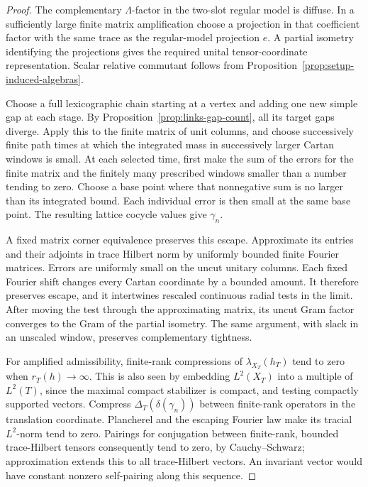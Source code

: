\begin{proof}
The complementary \(\Lambda\)-factor in the two-slot regular
model is diffuse.  In a sufficiently large finite matrix
amplification choose a projection in that coefficient factor
with the same trace as the regular-model projection \(e\).
A partial isometry identifying the projections gives the
required unital tensor-coordinate representation.  Scalar
relative commutant follows from
Proposition~\ref{prop:setup-induced-algebras}.

Choose a full lexicographic chain starting at a vertex and adding
one new simple gap at each stage. By
Proposition~\ref{prop:links-gap-count}, all its target gaps diverge.
Apply this to the finite
matrix of unit columns, and choose successively finite path
times at which the integrated mass in successively larger
Cartan windows is small.  At each selected time, first make the sum of the errors for the
finite matrix and the finitely many prescribed windows smaller than a
number tending to zero. Choose a base point where that nonnegative
sum is no larger than its integrated bound. Each individual error is
then small at the same base point. The resulting lattice cocycle values
give \(\gamma_n\).

A fixed matrix corner equivalence preserves this escape.
Approximate its entries and their adjoints in trace Hilbert
norm by uniformly bounded finite Fourier matrices.  Errors
are uniformly small on the uncut unitary columns.  Each
fixed Fourier shift changes every Cartan coordinate by a
bounded amount.  It therefore preserves escape, and it
intertwines rescaled continuous radial tests in the limit.
After moving the test through the approximating matrix,
its uncut Gram factor converges to the Gram of the partial
isometry.  The same argument, with slack in an unscaled
window, preserves complementary tightness.

For amplified admissibility, finite-rank compressions of
\(\lambda_{X_T}(h_T)\) tend to zero when \(r_T(h)\to\infty\).
This is also seen by embedding \(L^2(X_T)\) into a multiple
of \(L^2(T)\), since the maximal compact stabilizer is compact,
and testing compactly supported vectors.  Compress
\(\Delta_T(\delta(\gamma_n))\) between finite-rank operators
in the translation coordinate.  Plancherel and the escaping
Fourier law make its tracial \(L^2\)-norm tend to zero.
Pairings for conjugation between finite-rank, bounded
trace-Hilbert tensors consequently tend to zero, by
Cauchy--Schwarz; approximation extends this to all
trace-Hilbert vectors.  An invariant vector would have
constant nonzero self-pairing along this sequence.
\end{proof}

